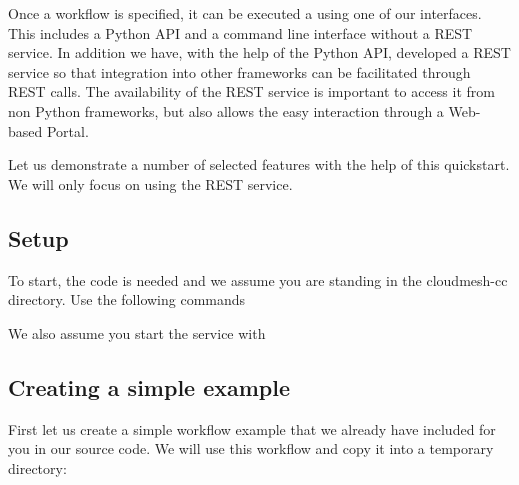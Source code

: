 Once a workflow is specified, it can be executed a using one of our
interfaces. This includes a Python API and a command line interface
without a REST service. In addition we have, with the help of the Python
API, developed a REST service so that integration into other frameworks
can be facilitated through REST calls. The availability of the REST
service is important to access it from non Python frameworks, but also
allows the easy interaction through a Web-based Portal.

Let us demonstrate a number of selected features with the help of this
quickstart. We will only focus on using the REST service.

\subsection{Setup}\label{setup}

To start, the code is needed and we assume you are standing in the
cloudmesh-cc directory. Use the following commands

\begin{Shaded}
\begin{Highlighting}[]
\end{Highlighting}
\end{Shaded}

We also assume you start the service with

\begin{Shaded}
\begin{Highlighting}[]
\end{Highlighting}
\end{Shaded}

\subsection{Creating a simple example}\label{creating-a-simple-example}

First let us create a simple workflow example that we already have
included for you in our source code. We will use this workflow and copy
it into a temporary directory:

\begin{Shaded}
\begin{Highlighting}[]
 
\PreprocessorTok{*}
\end{Highlighting}
\end{Shaded}

